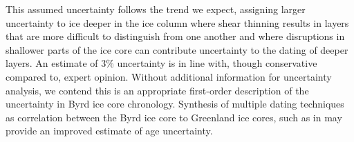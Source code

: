 \documentclass[12pt]{article}
\begin{document}
This assumed uncertainty follows the trend we expect, assigning larger uncertainty to ice deeper in the ice column where shear thinning results in layers that are more difficult to distinguish from one another and where disruptions in shallower parts of the ice core can contribute uncertainty to the dating of deeper layers. An estimate of 3\% uncertainty is in line with, though conservative compared to, expert opinion.  Without additional information for uncertainty analysis, we contend this is an appropriate first-order description of the uncertainty in Byrd ice core chronology. Synthesis of multiple dating techniques as correlation between the Byrd ice core to Greenland ice cores, such as in \citet{blunier01} may provide an improved estimate of age uncertainty.



\end{document}
